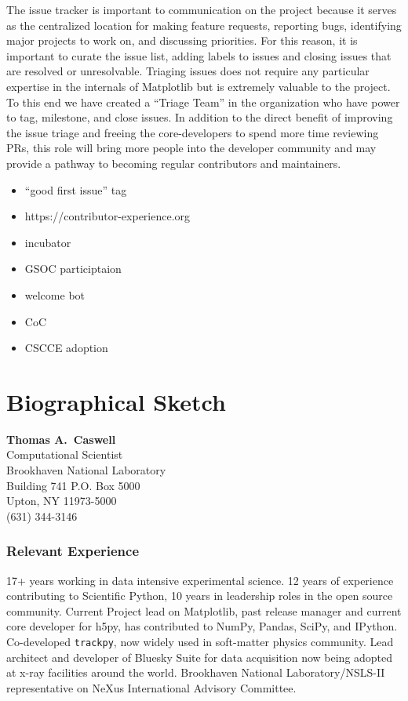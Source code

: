 \documentclass[12pt]{article}
\numberwithin{page}{section}
\begin{document}
The issue tracker is important to communication on the project because
it serves as the centralized location for making feature requests,
reporting bugs, identifying major projects to work on, and discussing
priorities.  For this reason, it is important to curate the issue
list, adding labels to issues and closing issues that are resolved or
unresolvable. Triaging issues does not require any particular
expertise in the internals of Matplotlib but is extremely valuable to
the project.  To this end we have created a ``Triage Team'' in the
organization who have power to tag, milestone, and close issues.  In
addition to the direct benefit of improving the issue triage and
freeing the core-developers to spend more time reviewing PRs, this
role will bring more people into the developer community and may
provide a pathway to becoming regular contributors and maintainers.


  \begin{itemize}
  \item  ``good first issue'' tag
  \item https://contributor-experience.org
  \item incubator
  \item GSOC participtaion
  \item welcome bot
  \item CoC
  \item CSCCE adoption
  \end{itemize}





\newpage
\section{Biographical Sketch}
\setcounter{page}{1}
\begin{center}
  \textbf{Thomas A.\ Caswell}\\
  Computational Scientist\\
  Brookhaven National Laboratory\\
  Building 741 P.O. Box 5000\\
  Upton, NY 11973-5000\\
  (631) 344-3146\\
\end{center}

\subsubsection*{Relevant Experience}
17+ years working in data intensive experimental science.  12 years of
experience contributing to Scientific Python, 10 years in leadership roles in
the open source community.  Current Project lead on Matplotlib, past release
manager and current core developer for h5py, has contributed to NumPy, Pandas,
SciPy, and IPython.  Co-developed \texttt{trackpy}, now widely used in
soft-matter physics community.  Lead architect and developer of Bluesky Suite
for data acquisition now being adopted at x-ray facilities around the world.
Brookhaven National Laboratory/NSLS-II representative on NeXus International
Advisory Committee.
\end{document}
